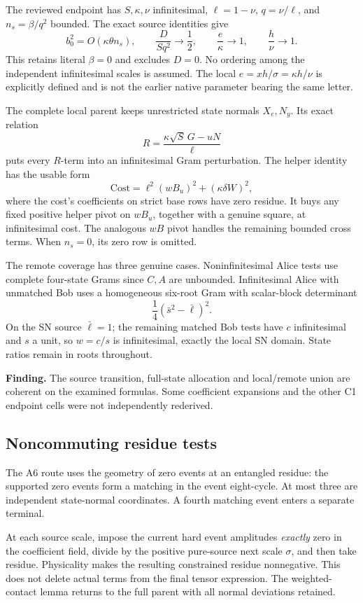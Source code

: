 The reviewed endpoint has \(S,\kappa,\nu\) infinitesimal,
\(\ell=1-\nu\), \(q=\nu/\ell\), and \(n_s=\beta/q^2\) bounded.
The exact source identities give
\[
 b_0^2=O(\kappa\theta n_s),\qquad
 \frac{D}{Sq^2}\longrightarrow\frac12,\qquad
 \frac e\kappa\longrightarrow1,\qquad
 \frac h\nu\longrightarrow1.
\]
This retains literal \(\beta=0\) and excludes \(D=0\).
No ordering among the independent infinitesimal scales is assumed.
The local \(e=xh/\sigma=\kappa h/\nu\) is explicitly defined and is
not the earlier native parameter bearing the same letter.

The complete local parent keeps unrestricted state normals
\(X_e,N_y\). Its exact relation
\[
 R=\frac{\kappa\sqrt S\,G-uN}{\ell}
\]
puts every \(R\)-term into an infinitesimal Gram perturbation.
The helper identity has the usable form
\[
 \mathrm{Cost}=\ell^2(wB_u)^2+(\kappa\delta W)^2,
\]
where the cost's coefficients on strict base rows have zero residue.
It buys any fixed positive helper pivot on \(wB_u\), together with
a genuine square, at infinitesimal cost. The analogous \(wB\) pivot
handles the remaining bounded cross terms.
When \(n_s=0\), its zero row is omitted.

The remote coverage has three genuine cases.
Noninfinitesimal Alice tests use complete four-state Grams since
\(C,A\) are unbounded. Infinitesimal Alice with unmatched Bob uses
a homogeneous six-root Gram with scalar-block determinant
\[
 \frac14(\bar s^2-\bar\ell)^2.
\]
On the SN source \(\bar\ell=1\); the remaining matched Bob tests have
\(c\) infinitesimal and \(s\) a unit, so \(w=c/s\) is infinitesimal,
exactly the local SN domain. State ratios remain in roots throughout.

\textbf{Finding.}
The source transition, full-state allocation and local/remote union
are coherent on the examined formulas. Some coefficient expansions
and the other C1 endpoint cells were not independently rederived.

\subsection{Noncommuting residue tests}

The A6 route uses the geometry of zero events at an entangled residue:
the supported zero events form a matching in the event eight-cycle.
At most three are independent state-normal coordinates. A fourth
matching event enters a separate terminal.

At each source scale, impose the current hard event amplitudes
\emph{exactly} zero in the coefficient field, divide by the positive
pure-source next scale \(\sigma\), and then take residue.
Physicality makes the resulting constrained residue nonnegative.
This does not delete actual terms from the final tensor expression.
The weighted-contact lemma returns to the full parent with all normal
deviations retained.

